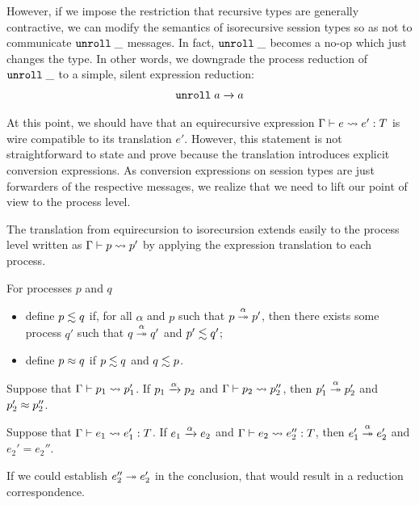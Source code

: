 However, if we impose the restriction that recursive types are
generally contractive, we can modify the semantics of isorecursive
session types so as not to communicate $\EUnroll\_$ messages. In fact,
$\EUnroll\_$ becomes a no-op which just changes the type. In other
words, we downgrade the process reduction of $\EUnroll\_$ to a simple,
silent expression reduction:
\begin{gather*}
  \reduce{\EUnroll a}{a}
\end{gather*}

At this point, we should have that an equirecursive expression
$\translation e{e'} T$ is wire compatible to its translation
$e'$. However, this statement is not straightforward to state and
prove because the translation introduces explicit conversion
expressions. As conversion expressions on session types are
just forwarders of the respective messages, we realize that we need to
lift our point of view to the process level.

The translation from equirecursion to isorecursion extends easily to
the process level written as $\Ptranslation p{p'}$ by applying the
expression translation to each process.


\begin{definition}
  For processes $p$ and $q$
  \begin{itemize}
  \item define $p \leftsim q$ if, for all $\alpha$ and $p$ such that
    $\reducemany[\alpha] p{p'}$, then there exists some process $q'$
    such that $\reducemany[\alpha] q{q'}$ and $p' \leftsim q'$;
  \item define $p \bisim q$ if $p \leftsim q$ and $q \leftsim p$.
  \end{itemize}
\end{definition}
\begin{conjecture}
  Suppose that $\Ptranslation {p_1}{p_1'}$.
  If $\reduce[\alpha]{p_1}{p_2}$
  and $\Ptranslation{p_2}{p_2''}$,
  then $\reducemany[\alpha]{p_1'}{p_2'}$
  and $p_2' \bisim p_2''$.
\end{conjecture}


\begin{conjecture}[obsolete]
  Suppose that $\translation {e_1}{e_1'} T$.
  If $\reduce[\alpha]{e_1}{e_2}$
  and $\translation{e_2}{e_2''}{T}$,
  then $\reducemany[\alpha]{e_1'}{e_2'}$
  and $e_2' = e_2''$.
\end{conjecture}
If we could establish $\reducemany{e_2''}{e_2'}$ in  the
conclusion, that would result in a reduction correspondence.


